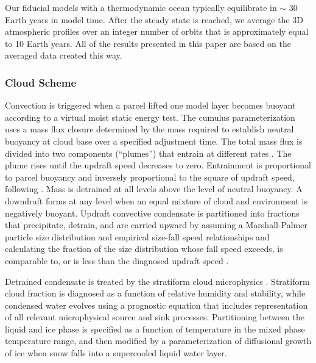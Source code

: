 \documentclass[11pt,numberedappendix,twocolappendix,]{emulateapj}
\begin{document}
Our fiducial models with a thermodynamic ocean typically equilibrate in $\sim $ 30 Earth years in model time. 
After the steady state is reached, we average the 3D atmospheric profiles over an integer number of orbits that is approximately equal to 10 Earth years. 
All of the results presented in this paper are based on the averaged data created this way. 

\subsubsection{Cloud Scheme}

%
Convection is triggered when a parcel lifted one model layer becomes buoyant according to a virtual moist static energy test. 
The cumulus parameterization uses a mass flux closure determined by the mass required to establish neutral buoyancy at cloud base over a specified adjustment time. 
The total mass flux is divided into two components (``plumes'') that entrain at different rates \citep{DelGenio2007}. 
The plume rises until the updraft speed decreases to zero. 
Entrainment is proportional to parcel buoyancy and inversely proportional to the square of updraft speed, following \citet{Gregory2001}. 
Mass is detrained at all levels above the level of neutral buoyancy. 
A downdraft forms at any level when an equal mixture of cloud and environment is negatively buoyant. 
Updraft convective condensate is partitioned into fractions that precipitate, detrain, and are carried upward by assuming a Marshall-Palmer particle size distribution and empirical size-fall speed relationships and calculating the fraction of the size distribution whose fall speed exceeds, is comparable to, or is less than the diagnosed updraft speed \citep{DelGenio2005}. 

Detrained condensate is treated by the stratiform cloud microphysics \citep[an updated version of][]{DelGenio1996}. 
Stratiform cloud fraction is diagnosed as a function of relative humidity and stability, while condensed water evolves using a prognostic equation that includes representation of all relevant microphysical source and sink processes.  
Partitioning between the liquid and ice phase is specified as a function of temperature in the mixed phase temperature range, and then modified by a parameterization of diffusional growth of ice when snow falls into a supercooled liquid water layer. 


\end{document}
